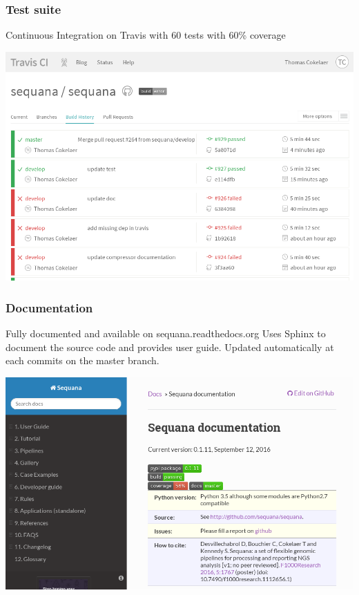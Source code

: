 \documentclass{beamer}
\begin{document}
\begin{frame}
    \frametitle{Test suite}
    \begin{block}{}
    Continuous Integration on Travis with 60 tests with 60\% coverage
    \end{block}
    
    
        \includegraphics[scale=0.35]{images/travis}
\end{frame}


\begin{frame}
    \frametitle{Documentation}
    Fully documented and available on sequana.readthedocs.org
    Uses Sphinx to document the source code and provides user guide.
    Updated automatically at each commits on the master branch.
\begin{center}
\includegraphics[scale=0.3]{images/rtd}
\end{center}
\end{frame}
\end{document}
